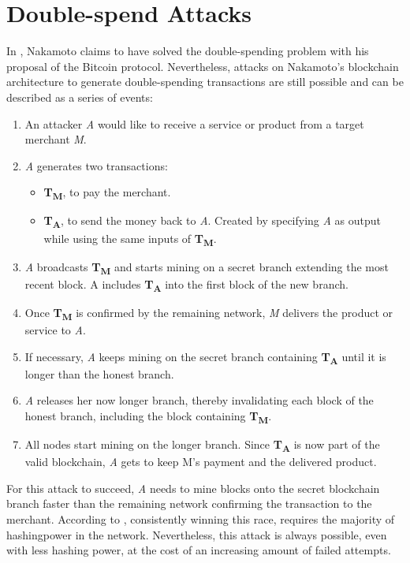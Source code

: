 \documentclass[a4paper,12pt,twoside]{report}
\begin{document}
\section{Double-spend Attacks} \label{dsa}
In \cite{nakamoto2008bitcoin}, Nakamoto claims to have solved the double-spending problem with his proposal of the Bitcoin protocol. Nevertheless, attacks on Nakamoto's blockchain architecture to generate double-spending transactions are still possible and can be described as a series of events:
\begin{enumerate}
\item An attacker \textit{A} would like to receive a service or product from a target merchant \textit{M}.
\item \textit{A} generates two transactions:
\begin{itemize}
\item \textbf{T\textsubscript{M}}, to pay the merchant.
\item \textbf{T\textsubscript{A}}, to send the money back to \textit{A}. Created by specifying \textit{A} as output while using the same inputs of \textbf{T\textsubscript{M}}.
\end{itemize}
\item \textit{A} broadcasts \textbf{T\textsubscript{M}} and starts mining on a secret branch extending the most recent block. A includes \textbf{T\textsubscript{A}} into the first block of the new branch.
\item Once \textbf{T\textsubscript{M}} is confirmed by the remaining network, \textit{M} delivers the product or service to \textit{A}.
\item If necessary, \textit{A} keeps mining on the secret branch containing \textbf{T\textsubscript{A}} until it is longer than the honest branch.
\item \textit{A} releases her now longer branch, thereby invalidating each block of the honest branch, including the block containing \textbf{T\textsubscript{M}}.
\item All nodes start mining on the longer branch. Since \textbf{T\textsubscript{A}} is now part of the valid blockchain, \textit{A} gets to keep M's payment and the delivered product.
\end{enumerate}
For this attack to succeed, \textit{A} needs to mine blocks onto the secret blockchain branch faster than the remaining network confirming the transaction to the merchant. According to \cite{nakamoto2008bitcoin}, consistently winning this race, requires the majority of hashingpower in the network. Nevertheless, this attack is always possible, even with less hashing power, at the cost of an increasing amount of failed attempts. \cite{HBDSA,DSAwithTime}
\end{document}

